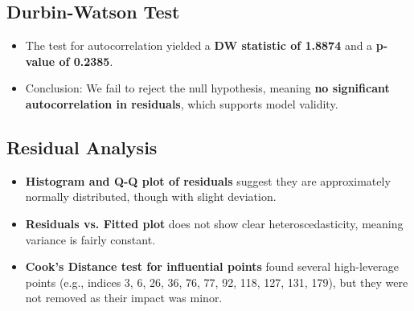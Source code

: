 \documentclass{article}
\begin{document}
\subsection{Durbin-Watson Test}
\begin{itemize}
    \item The test for autocorrelation yielded a \textbf{DW statistic of 1.8874} and a \textbf{p-value of 0.2385}.
    \item Conclusion: We fail to reject the null hypothesis, meaning \textbf{no significant autocorrelation in residuals}, which supports model validity.
\end{itemize}

\subsection{Residual Analysis}
\begin{itemize}
    \item \textbf{Histogram and Q-Q plot of residuals} suggest they are approximately normally distributed, though with slight deviation.
    \item \textbf{Residuals vs. Fitted plot} does not show clear heteroscedasticity, meaning variance is fairly constant.
    \item \textbf{Cook’s Distance test for influential points} found several high-leverage points (e.g., indices 3, 6, 26, 36, 76, 77, 92, 118, 127, 131, 179), but they were not removed as their impact was minor.
\end{itemize}

\end{document}
